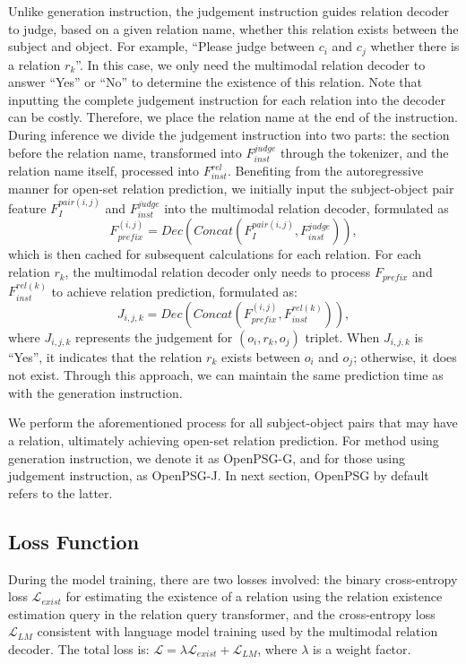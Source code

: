 Unlike generation instruction, the judgement instruction guides relation decoder to judge, based on a given relation name, whether this relation exists between the subject and object.
For example, ``Please judge between $c_i$ and $c_j$ whether there is a relation $r_k$''.
In this case, we only need the multimodal relation decoder to answer ``Yes'' or ``No'' to determine the existence of this relation.
Note that inputting the complete judgement instruction for each relation into the decoder can be costly.
Therefore, we place the relation name at the end of the instruction.
During inference we divide the judgement instruction into two parts: the section before the relation name, transformed into $F_{inst}^{judge}$ through the tokenizer, and the relation name itself, processed into $F_{inst}^{rel}$.
Benefiting from the autoregressive manner for open-set relation prediction, we initially input the subject-object pair feature $F_{I}^{pair(i,j)}$ and $F_{inst}^{judge}$ into the multimodal relation decoder, formulated as
\begin{equation}
    F_{prefix}^{(i,j)} = Dec(Concat(F_{I}^{pair(i,j)}, F_{inst}^{judge})),
\end{equation}
which is then cached for subsequent calculations for each relation.
For each relation $r_k$, the multimodal relation decoder only needs to process $F_{prefix}$ and $F_{inst}^{rel(k)}$ to achieve relation prediction, formulated as:
\begin{equation}
    J_{i,j,k} = Dec(Concat(F_{prefix}^{(i,j)}, F_{inst}^{rel(k)})),
\end{equation}
where $J_{i,j,k}$ represents the judgement for $(o_i, r_k, o_j)$ triplet.
When $J_{i,j,k}$ is ``Yes'', it indicates that the relation $r_k$ exists between $o_i$ and $o_j$; otherwise, it does not exist.
Through this approach, we can maintain the same prediction time as with the generation instruction.

We perform the aforementioned process for all subject-object pairs that may have a relation, ultimately achieving open-set relation prediction.
For method using generation instruction, we denote it as OpenPSG-G, and for those using judgement instruction, as OpenPSG-J.
In next section, OpenPSG by default refers to the latter.

\subsection{Loss Function}
\label{openpsg:sec:loss_function}
During the model training, there are two losses involved:
the binary cross-entropy loss $\mathcal{L}_{exist}$ for estimating the existence of a relation using the relation existence estimation query in the relation query transformer, and the cross-entropy loss $\mathcal{L}_{LM}$ consistent with language model training used by the multimodal relation decoder.
The total loss is:
$\mathcal{L} = \lambda \mathcal{L}_{exist} + \mathcal{L}_{LM}$,
where $\lambda$ is a weight factor.
